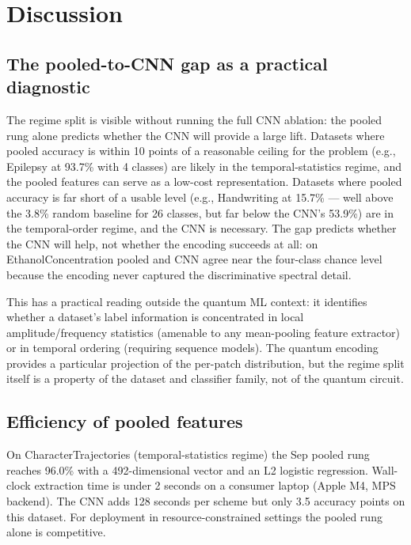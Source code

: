 \documentclass[conference,compsoc]{IEEEtran}
\begin{document}
\section{Discussion}
\label{sec:discussion}

\subsection{The pooled-to-CNN gap as a practical diagnostic}

The regime split is visible without running the full CNN ablation:
the pooled rung alone predicts whether the CNN will provide a large
lift.
Datasets where pooled accuracy is within 10 points of
a reasonable ceiling for the problem (e.g., Epilepsy at 93.7\% with
4 classes) are likely in the temporal-statistics regime, and the
pooled features can serve as a low-cost representation.
Datasets where pooled accuracy is far short of a usable level
(e.g., Handwriting at 15.7\% --- well above the 3.8\% random baseline
for 26 classes, but far below the CNN's 53.9\%) are in the
temporal-order regime, and the CNN is necessary.
The gap predicts whether the CNN will help, not whether the encoding
succeeds at all: on EthanolConcentration pooled and CNN agree near the
four-class chance level because the encoding never captured the
discriminative spectral detail.

This has a practical reading outside the quantum ML context: it
identifies whether a dataset's label information is concentrated in
local amplitude/frequency statistics (amenable to any mean-pooling
feature extractor) or in temporal ordering (requiring sequence models).
The quantum encoding provides a particular projection of the
per-patch distribution, but the regime split itself is a property of
the dataset and classifier family, not of the quantum circuit.

\subsection{Efficiency of pooled features}

On CharacterTrajectories (temporal-statistics regime) the Sep pooled
rung reaches 96.0\% with a 492-dimensional vector and an L2
logistic regression.
Wall-clock extraction time is under 2 seconds on a consumer laptop
(Apple M4, MPS backend).
The CNN adds 128 seconds per scheme but only 3.5 accuracy points
on this dataset.
For deployment in resource-constrained settings the pooled rung alone
is competitive.
\end{document}
